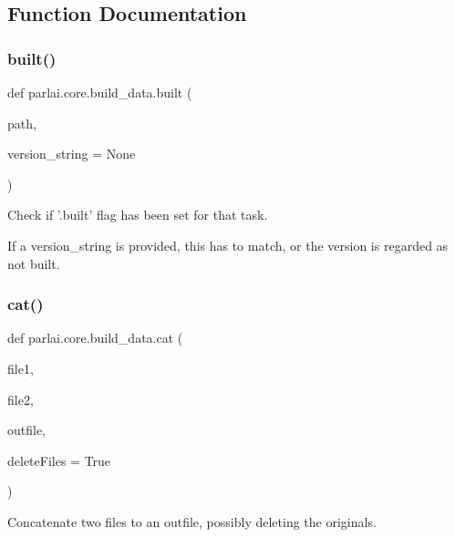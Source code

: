\subsection{Function Documentation}
\mbox{\label{namespaceparlai_1_1core_1_1build__data_ad834e1a9be02e18a6c2de2b03b9a8f10}} 
\subsubsection{\texorpdfstring{built()}{built()}}
{\footnotesize\ttfamily def parlai.\+core.\+build\+\_\+data.\+built (\begin{DoxyParamCaption}\item[{}]{path,  }\item[{}]{version\+\_\+string = {\ttfamily None} }\end{DoxyParamCaption})}

\begin{DoxyVerb}Check if '.built' flag has been set for that task.

If a version_string is provided, this has to match, or the version is regarded as
not built.
\end{DoxyVerb}
 \mbox{\label{namespaceparlai_1_1core_1_1build__data_adc4feba864e2a0d0663cdf6bf84afaf6}} 
\subsubsection{\texorpdfstring{cat()}{cat()}}
{\footnotesize\ttfamily def parlai.\+core.\+build\+\_\+data.\+cat (\begin{DoxyParamCaption}\item[{}]{file1,  }\item[{}]{file2,  }\item[{}]{outfile,  }\item[{}]{delete\+Files = {\ttfamily True} }\end{DoxyParamCaption})}

\begin{DoxyVerb}Concatenate two files to an outfile, possibly deleting the originals.
\end{DoxyVerb}
 \mbox{\label{namespaceparlai_1_1core_1_1build__data_ab74f0e428f05e5d91fa93c8afb367622}} 
